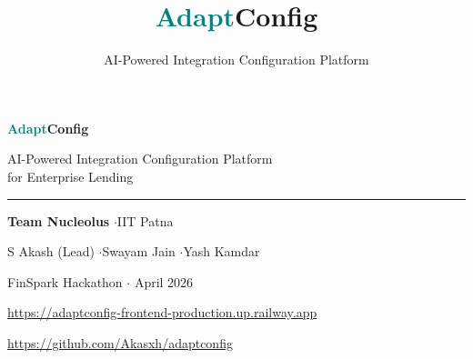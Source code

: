 \documentclass[aspectratio=169,11pt]{beamer}
\title{\textcolor{teal}{Adapt}Config}
\subtitle{AI-Powered Integration Configuration Platform}
\author{}
\institute{}
\date{}
\begin{document}
\begin{frame}[plain]
\vspace{1.2cm}
\begin{center}
{\Huge\bfseries \textcolor{teal}{Adapt}Config}

\vspace{0.4em}
{\large\color{ts} AI-Powered Integration Configuration Platform\\for Enterprise Lending}

\vspace{1em}
{\color{teal}\rule{6cm}{0.5pt}}

\vspace{0.8em}
{\normalsize\textbf{Team Nucleolus} \quad$\cdot$\quad IIT Patna}

\vspace{0.4em}
{\normalsize S Akash (Lead) \quad$\cdot$\quad Swayam Jain \quad$\cdot$\quad Yash Kamdar}

\vspace{0.8em}
{\small\color{ts} FinSpark Hackathon $\cdot$ April 2026}

\vspace{0.5em}
{\small\textcolor{teal}{\url{https://adaptconfig-frontend-production.up.railway.app}}}

\vspace{0.2em}
{\scriptsize\color{ts} \url{https://github.com/Akasxh/adaptconfig}}
\end{center}
\end{frame}
\end{document}
